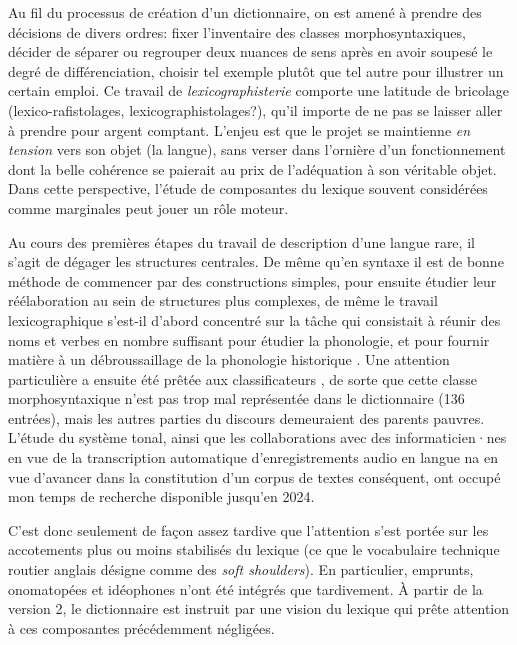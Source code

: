 Au fil du processus de création d'un dictionnaire, on est amené à prendre des décisions de divers ordres: fixer l'inventaire des classes morphosyntaxiques, décider de séparer ou regrouper deux nuances de sens après en avoir soupesé le degré de différenciation, choisir tel exemple plutôt que tel autre pour illustrer un certain emploi. Ce travail de \emph{lexicographisterie} comporte une latitude de bricolage (lexico-rafistolages, lexicographistolages?), qu'il importe de ne pas se laisser aller à prendre pour argent comptant. L'enjeu est que le projet se maintienne \emph{en tension} vers son objet (la langue), sans verser dans l'ornière d'un fonctionnement dont la belle cohérence se paierait au prix de l'adéquation à son véritable objet. Dans cette perspective, l'étude de composantes du lexique souvent considérées comme marginales peut jouer un rôle moteur.

Au cours des premières étapes du travail de description d'une langue rare, il s'agit de dégager les structures centrales. De même qu'en syntaxe il est de bonne méthode de commencer par des constructions simples, pour ensuite étudier leur réélaboration au sein de structures plus complexes, de même le travail lexicographique s'est-il d'abord concentré sur la tâche qui consistait à réunir des noms et verbes en nombre suffisant pour étudier la phonologie, et pour fournir matière à un débroussaillage de la phonologie historique \parencite{jacquesetal2011}. Une attention particulière a ensuite été prêtée aux classificateurs \parencite{michaud2011c,michaud2013d}, de sorte que cette classe morphosyntaxique n'est pas trop mal représentée dans le dictionnaire (136 entrées), mais les autres parties du discours demeuraient des parents pauvres. L'étude du système tonal, ainsi que les collaborations avec des informaticien·nes en vue de la transcription automatique d'enregistrements audio en langue na \parencite{michaudetal2018integrating,guillaume_plugging_2022} en vue d'avancer dans la constitution d'un corpus de textes conséquent, ont occupé mon temps de recherche disponible jusqu'en 2024.

C'est donc seulement de façon assez tardive que l'attention s'est portée sur les accotements plus ou moins stabilisés du lexique (ce que le vocabulaire technique routier anglais désigne comme des \emph{soft shoulders}). En particulier, emprunts, onomatopées et idéophones n'ont été intégrés que tardivement. À partir de la version 2, le dictionnaire est instruit par une vision du lexique qui prête attention à ces composantes précédemment négligées.

